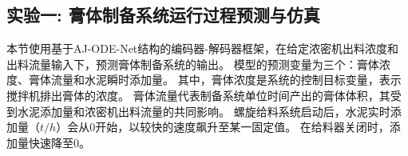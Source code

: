\subsection{实验一: 膏体制备系统运行过程预测与仿真}
\label{sec:case-study1}
本节使用基于AJ-ODE-Net结构的编码器-解码器框架，在给定浓密机出料浓度和出料流量输入下，预测膏体制备系统的输出。
模型的预测变量为三个：膏体浓度、膏体流量和水泥瞬时添加量。
其中，膏体浓度是系统的控制目标变量，表示搅拌机排出膏体的浓度。
膏体流量代表制备系统单位时间产出的膏体体积，其受到水泥添加量和浓密机出料流量的共同影响。
螺旋给料系统启动后，水泥实时添加量（$t/h$）会从0开始，以较快的速度飙升至某一固定值。
在给料器关闭时，添加量快速降至0。

